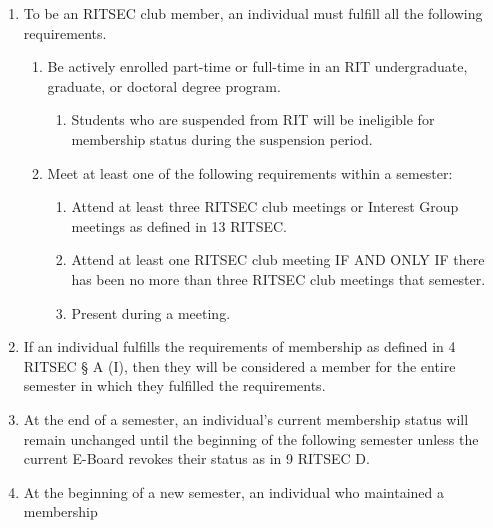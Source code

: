 


\begin{enumerate}
	\item To be an RITSEC club member, an individual must fulfill all the following
	      requirements.
	      \begin{enumerate}
		      \item Be actively enrolled part-time or full-time in an RIT undergraduate, graduate,
		            or doctoral degree program.
		            \begin{enumerate}
			            \item Students who are suspended from RIT will be ineligible for membership status
			                  during the suspension period.
		            \end{enumerate}
		      \item Meet at least one of the following requirements within a semester:
		            \begin{enumerate}
			            \item Attend at least three RITSEC club meetings or Interest Group meetings as defined in 13 RITSEC\@.
			            \item Attend at least one RITSEC club meeting IF AND ONLY IF there has been no more
			                  than three RITSEC club meetings that semester.
					\item Present during a meeting.
		            \end{enumerate}
	      \end{enumerate}
	\item If an individual fulfills the requirements of membership as defined in 4 RITSEC
	      § A (I), then they will be considered a member for the entire semester in which
	      they fulfilled the requirements.
	\item At the end of a semester, an individual's current membership status will remain
	      unchanged until the beginning of the following semester unless the current
	      E-Board revokes their status as in 9 RITSEC D.
	\item At the beginning of a new semester, an individual who maintained a membership

\end{enumerate}
